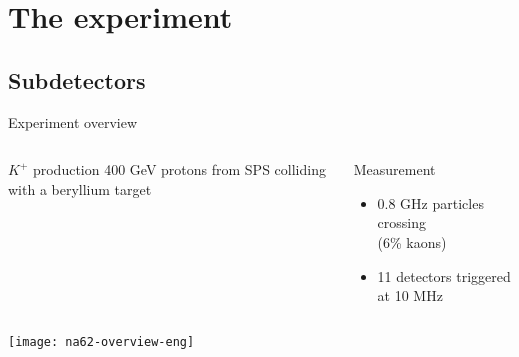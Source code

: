 \section{The experiment}



\subsection{Subdetectors}
\begin{frame}{Experiment overview}{}
	\begin{columns}
	 	\begin{block}{$K^+$ production}
	    		400 GeV protons from SPS colliding with a beryllium target
			\end{block}
	    	\begin{block}{Measurement}
		    	\begin{itemize}
		    	  \item 0.8 GHz particles crossing\\ (6\% kaons)
				  \item 11 detectors triggered at 10 MHz
				\end{itemize}	    		
			\end{block}
	\end{columns}
	
	\begin{center} 
		\texttt{[image: na62-overview-eng]}
	\end{center}
\end{frame}

